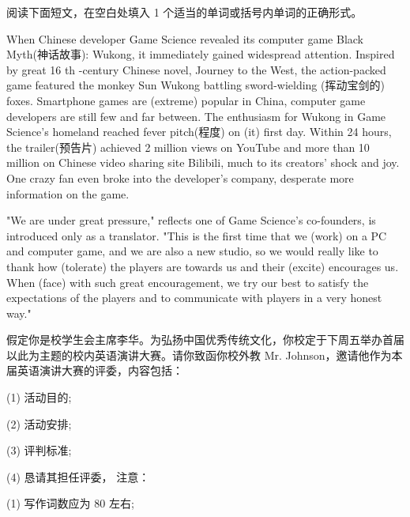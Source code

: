 \documentclass{英语试卷}
\begin{document}
\par 阅读下面短文，在空白处填入 1 个适当的单词或括号内单词的正确形式。\par
\par When Chinese developer Game Science revealed its computer game Black Myth(神话故事): Wukong, it immediately gained widespread attention. Inspired by  great 16 th -century Chinese novel, Journey to the West, the action-packed game featured the monkey Sun Wukong battling sword-wielding (挥动宝剑的) foxes. Smartphone games are  (extreme) popular in China,  computer game developers are still few and far between. The enthusiasm for Wukong in Game Science's homeland reached fever pitch(程度) on  (it) first day. Within 24 hours, the trailer(预告片) achieved 2 million views on YouTube and more than 10 million on Chinese video sharing site Bilibili, much to its creators' shock and joy. One crazy fan even broke into the developer's company, desperate  more information on the game.\par
\par "We are under great pressure," reflects one of Game Science's co-founders,  is introduced only as a translator. "This is the first time that we  (work) on a PC and computer game, and we are also a new studio, so we would really like to thank how  (tolerate) the players are towards us and their  (excite) encourages us. When  (face) with such great encouragement, we try our best to satisfy the expectations of the players and to communicate with players in a very honest way."\par
{}
\par 假定你是校学生会主席李华。为弘扬中国优秀传统文化，你校定于下周五举办首届以此为主题的校内英语演讲大赛。请你致函你校外教 Mr. Johnson，邀请他作为本届英语演讲大赛的评委，内容包括：\par
\par (1) 活动目的;\par
\par (2) 活动安排;\par
\par (3) 评判标准;\par
\par (4) 恳请其担任评委， 注意：\par
\par (1) 写作词数应为 80 左右;\par
\end{document}
